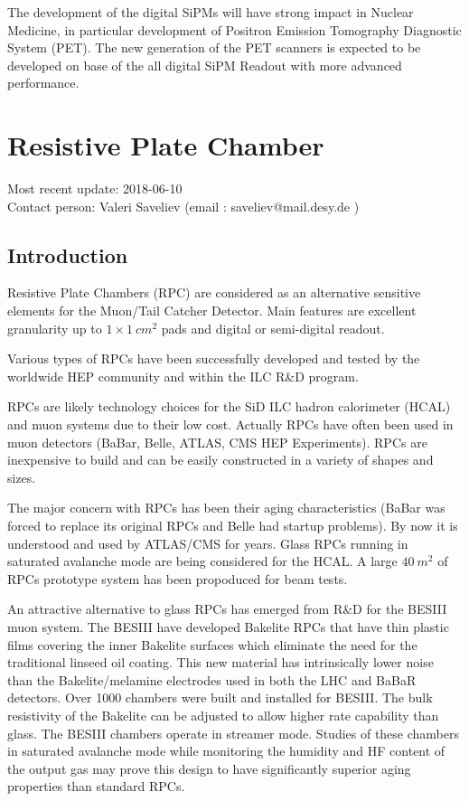 The development of the digital SiPMs will have strong impact in Nuclear Medicine, in particular development of Positron Emission Tomography Diagnostic System (PET). The new generation of the PET scanners is expected to be developed on base of the all digital SiPM Readout with more advanced performance.

\section{Resistive Plate Chamber }
Most recent update: 2018-06-10 \\
Contact person: Valeri Saveliev (email : saveliev@mail.desy.de )

\subsection{Introduction}

Resistive Plate Chambers (RPC) are considered as an alternative sensitive elements for the Muon/Tail Catcher Detector.
Main features are excellent granularity up to $1\times\SI{1}{cm^2}$ pads and digital or semi-digital readout.

Various types of RPCs have been successfully developed and tested by the worldwide HEP community and within the ILC R\&D program.

RPCs are likely technology choices for the SiD ILC hadron calorimeter (HCAL) and muon systems due to their low cost. Actually
RPCs have often been used in muon detectors (BaBar, Belle, ATLAS, CMS HEP Experiments). RPCs are inexpensive to build and can be easily constructed in a variety of shapes and sizes.

The major concern with RPCs has been their aging characteristics (BaBar was forced to replace its original RPCs and Belle had startup problems). By now it is understood and used by ATLAS/CMS for years.
Glass RPCs running in saturated avalanche mode are being considered for the HCAL. A large $\SI{40}{m^2}$ of RPCs prototype system has been propoduced for beam tests.

An attractive alternative to glass RPCs has emerged from R\&D for the BESIII muon system. The BESIII have developed Bakelite RPCs that have thin plastic films covering the inner Bakelite surfaces which eliminate the need for the traditional linseed oil coating. This new material has intrinsically lower noise than the Bakelite/melamine electrodes used in both the LHC and BaBaR detectors. Over 1000 chambers were built and installed for BESIII. The bulk resistivity of the Bakelite can be adjusted to allow higher rate capability than glass. The BESIII chambers operate in streamer mode. Studies of these chambers in saturated avalanche mode while monitoring the humidity and HF content of the output gas may prove this design to have significantly superior aging properties than standard RPCs.

